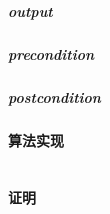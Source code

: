 \documentclass[a4paper]{book}
\numberwithin{equation}{chapter}
\theoremstyle{definition}
\begin{document}
\begin{multicols}{2}
\subparagraph{output}

\subparagraph{precondition}

\subparagraph{postcondition}

\paragraph{算法实现}
\begin{lstlisting}

\end{lstlisting}
\paragraph{证明}



\end{multicols}
\end{document}
